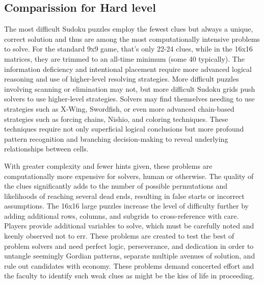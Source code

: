\documentclass[conference]{IEEEtran}
\begin{document}
\subsection{Comparission for Hard level}
The most difficult Sudoku puzzles employ the fewest clues but always a unique, correct solution and thus are among the most computationally intensive problems to solve. For the standard 9x9 game, that's only 22-24 clues, while in the 16x16 matrices, they are trimmed to an all-time minimum (some 40 typically). The information deficiency and intentional placement require more advanced logical reasoning and use of higher-level resolving strategies. More difficult puzzles involving scanning or elimination may not, but more difficult Sudoku grids push solvers to use higher-level strategies. Solvers may find themselves needing to use strategies such as X-Wing, Swordfish, or even more advanced chain-based strategies such as forcing chains, Nishio, and coloring techniques. These techniques require not only superficial logical conclusions but more profound pattern recognition and branching decision-making to reveal underlying relationships between cells.

With greater complexity and fewer hints given, these problems are computationally more expensive for solvers, human or otherwise. The quality of the clues significantly adds to the number of possible permutations and likelihoods of reaching several dead ends, resulting in false starts or incorrect assumptions. The 16x16 large puzzles increase the level of difficulty further by adding additional rows, columns, and subgrids to cross-reference with care. Players provide additional variables to solve, which must be carefully noted and keenly observed not to err. These problems are created to test the best of problem solvers and need perfect logic, perseverance, and dedication in order to untangle seemingly Gordian patterns, separate multiple avenues of solution, and rule out candidates with economy. These problems demand concerted effort and the faculty to identify such weak clues as might be the kiss of life in proceeding.
\end{document}
